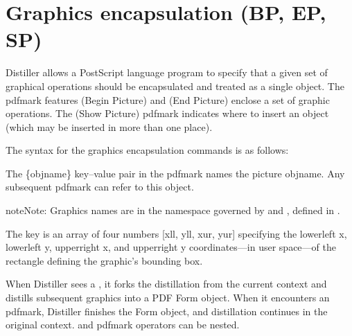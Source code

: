 \documentclass[letterpaper,12pt,english,openany,oneside]{sphinxmanual}
\begin{document}
\section{Graphics encapsulation (BP, EP, SP)}
\label{\detokenize{pdfmark_Basic:graphics-encapsulation-bp-ep-sp}}
Distiller allows a PostScript language program to specify that a given set of graphical operations should be encapsulated and treated as a single object. The pdfmark features  (Begin Picture) and  (End Picture) enclose a set of graphic operations. The  (Show Picture) pdfmark indicates where to insert an object (which may be inserted in more than one place).

The syntax for the graphics encapsulation commands is as follows:

\begin{sphinxVerbatim}[commandchars=\\\{\}]
\PYG{p}{[}    \PYG{p}{[}   \PYG{p}{]}  
       
   \PYG{p}{[}  
   \PYG{p}{[}     
\end{sphinxVerbatim}

The  \{objname\} key–value pair in the  pdfmark names the picture objname. Any subsequent pdfmark can refer to this object.

\begin{sphinxadmonition}{note}{Note:}
Graphics names are in the namespace governed by  and  , defined in .
\end{sphinxadmonition}

The  key is an array of four numbers {[}xll, yll, xur, yur{]} specifying the lower\sphinxhyphen{}left x, lower\sphinxhyphen{}left y, upper\sphinxhyphen{}right x, and upper\sphinxhyphen{}right y coordinates—in user space—of the rectangle defining the graphic’s bounding box.

When Distiller sees a  , it forks the distillation from the current context and distills subsequent graphics into a PDF Form object. When it encounters an  pdfmark, Distiller finishes the Form object, and distillation continues in the original context.  and  pdfmark operators can be nested.
\end{document}
